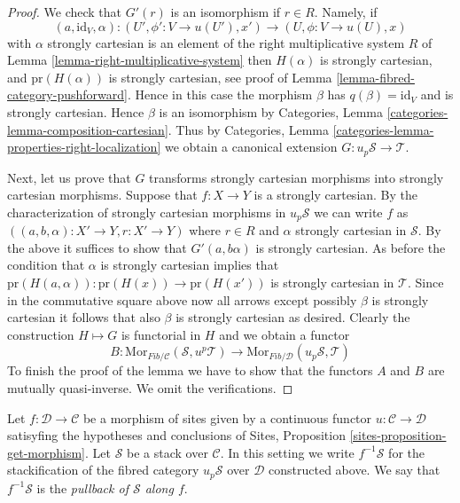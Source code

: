 \begin{proof}
\medskip\noindent
We check that $G'(r)$ is an isomorphism if $r \in R$.
Namely, if
$$
(a, \text{id}_V, \alpha) :
(U', \phi' : V \to u(U'), x')
\longrightarrow
(U, \phi : V \to u(U), x)
$$
with $\alpha$ strongly cartesian is an element of the right multiplicative
system $R$ of
Lemma \ref{lemma-right-multiplicative-system}
then $H(\alpha)$ is strongly cartesian, and
$\text{pr}(H(\alpha))$ is strongly cartesian, see proof of
Lemma \ref{lemma-fibred-category-pushforward}.
Hence in this case the morphism $\beta$ has $q(\beta) = \text{id}_V$
and is strongly cartesian. Hence $\beta$ is an isomorphism by
Categories, Lemma \ref{categories-lemma-composition-cartesian}.
Thus by
Categories, Lemma \ref{categories-lemma-properties-right-localization}
we obtain a canonical extension $G : u_p\mathcal{S} \to \mathcal{T}$.

\medskip\noindent
Next, let us prove that $G$ transforms strongly cartesian morphisms
into strongly cartesian morphisms.
Suppose that $f : X \to Y$ is a strongly cartesian. By the characterization
of strongly cartesian morphisms in $u_p\mathcal{S}$ we can write $f$ as
$((a, b, \alpha) : X' \to Y, r : X' \to Y)$ where $r \in R$ and
$\alpha$ strongly cartesian in $\mathcal{S}$. By the above it suffices
to show that $G'(a, b \alpha)$ is strongly cartesian. As before
the condition that $\alpha$ is strongly cartesian implies that
$\text{pr}(H(a, \alpha)) : \text{pr}(H(x)) \to \text{pr}(H(x'))$
is strongly cartesian in $\mathcal{T}$. Since in the commutative
square above now all arrows except possibly $\beta$ is strongly cartesian
it follows that also $\beta$ is strongly cartesian as desired.
Clearly the construction $H \mapsto G$ is functorial in $H$ and we
obtain a functor
$$
B :
\text{Mor}_{\textit{Fib}/\mathcal{C}}(\mathcal{S}, u^p\mathcal{T})
\longrightarrow
\text{Mor}_{\textit{Fib}/\mathcal{D}}(u_p\mathcal{S}, \mathcal{T})
$$
To finish the proof of the lemma we have to show that the functors
$A$ and $B$ are mutually quasi-inverse. We omit the verifications.
\end{proof}

\begin{definition}
\label{definition-pullback-stack}
Let $f : \mathcal{D} \to \mathcal{C}$ be a morphism of sites
given by a continuous functor $u : \mathcal{C} \to \mathcal{D}$
satisyfing the hypotheses and conclusions of
Sites, Proposition \ref{sites-proposition-get-morphism}.
Let $\mathcal{S}$ be a stack over $\mathcal{C}$.
In this setting we write {\it $f^{-1}\mathcal{S}$} for the stackification
of the fibred category $u_p\mathcal{S}$ over $\mathcal{D}$ constructed
above. We say that $f^{-1}\mathcal{S}$ is the
{\it pullback of $\mathcal{S}$ along $f$}.
\end{definition}

